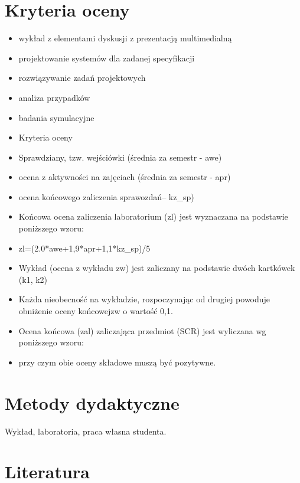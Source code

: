 \documentclass[12pt, a4paper]{article}
\begin{document}
\section{Kryteria oceny}

\begin{itemize}
  \item wykład z elementami dyskusji z prezentacją multimedialną
  \item projektowanie systemów dla zadanej specyfikacji
  \item rozwiązywanie zadań projektowych
  \item analiza przypadków
  \item badania symulacyjne
  \item Kryteria oceny
  \item Sprawdziany, tzw. wejściówki (średnia za semestr - awe)
  \item ocena z aktywności na zajęciach (średnia za semestr - apr)
  \item ocena końcowego zaliczenia sprawozdań– kz\_sp)
  \item Końcowa ocena zaliczenia laboratorium (zl) jest wyznaczana na podstawie poniższego wzoru:
  \item zl=(2.0*awe+1,9*apr+1,1*kz\_sp)/5
  \item Wykład (ocena z wykładu zw) jest zaliczany na podstawie dwóch kartkówek (k1, k2)
  \item Każda nieobecność na wykładzie, rozpoczynając od drugiej powoduje obniżenie oceny końcowejzw o wartość 0,1.
  \item Ocena końcowa (zal) zaliczająca przedmiot (SCR) jest wyliczana wg poniższego wzoru:
  \item przy czym obie oceny składowe muszą być pozytywne.
\end{itemize}

\section{Metody dydaktyczne}

Wykład, laboratoria, praca własna studenta.

\section{Literatura}
\end{document}
